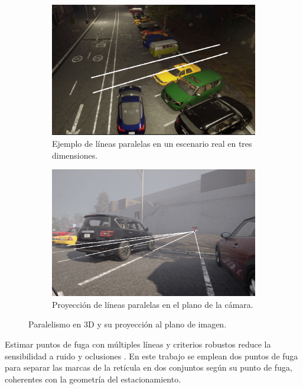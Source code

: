 \begin{figure}[!ht]
	\centering
	\begin{subfigure}{0.4\textwidth}
		\includegraphics[width=\textwidth]{img/reticule/paralel_lines}
		\caption{Ejemplo de líneas paralelas en un escenario real en tres dimensiones.}
	\end{subfigure}
	\begin{subfigure}{0.4\textwidth}
		\includegraphics[width=\textwidth]{img/reticule/pov}
		\caption{Proyección de líneas paralelas en el plano de la cámara.}
	\end{subfigure}
	\caption{Paralelismo en 3D y su proyección al plano de imagen.}
	\label{fig:distorion-teo}
\end{figure}


Estimar puntos de fuga con múltiples líneas y criterios robustos reduce la sensibilidad a ruido y oclusiones
\cite{hartley2003multiple,kanatani1998statistical}. En este trabajo se emplean dos puntos de fuga para separar
las marcas de la retícula en dos conjuntos según su punto de fuga, coherentes con la geometría del estacionamiento.
